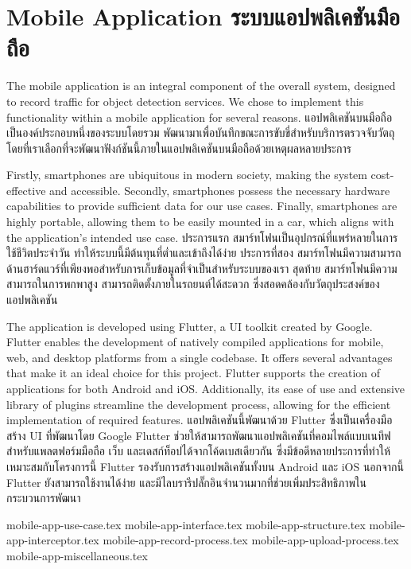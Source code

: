 \clearpage

\section{\ifenglish Mobile Application \else ระบบแอปพลิเคชันมือถือ \fi}
\ifenglish
The mobile application is an integral component of the overall system, designed to record traffic for object detection services. We chose to implement this functionality within a mobile application for several reasons.
\else
แอปพลิเคชันบนมือถือเป็นองค์ประกอบหนึ่งของระบบโดยรวม พัฒนามาเพื่อบันทึกขณะการขับขี่สำหรับบริการตรวจจับวัตถุ โดยที่เราเลือกที่จะพัฒนาฟังก์ชันนี้ภายในแอปพลิเคชันบนมือถือด้วยเหตุผลหลายประการ
\fi

\ifenglish
Firstly, smartphones are ubiquitous in modern society, making the system cost-effective and accessible. Secondly, smartphones possess the necessary hardware capabilities to provide sufficient data for our use cases. Finally, smartphones are highly portable, allowing them to be easily mounted in a car, which aligns with the application's intended use case.
\else
ประการแรก สมาร์ทโฟนเป็นอุปกรณ์ที่แพร่หลายในการใช้ชีวิตประจำวัน ทำให้ระบบนี้มีต้นทุนที่ต่ำและเข้าถึงได้ง่าย ประการที่สอง สมาร์ทโฟนมีความสามารถด้านฮาร์ดแวร์ที่เพียงพอสำหรับการเก็บข้อมูลที่จำเป็นสำหรับระบบของเรา สุดท้าย สมาร์ทโฟนมีความสามารถในการพกพาสูง สามารถติดตั้งภายในรถยนต์ได้สะดวก ซึ่งสอดคล้องกับวัตถุประสงค์ของแอปพลิเคชัน
\fi

\ifenglish
The application is developed using Flutter, a UI toolkit created by Google. \cite{flutter-doc} Flutter enables the development of natively compiled applications for mobile, web, and desktop platforms from a single codebase. It offers several advantages that make it an ideal choice for this project. Flutter supports the creation of applications for both Android and iOS. Additionally, its ease of use and extensive library of plugins streamline the development process, allowing for the efficient implementation of required features.
\else
แอปพลิเคชันนี้พัฒนาด้วย Flutter ซึ่งเป็นเครื่องมือสร้าง UI ที่พัฒนาโดย Google Flutter \cite{flutter-doc} ช่วยให้สามารถพัฒนาแอปพลิเคชันที่คอมไพล์แบบเนทีฟสำหรับแพลตฟอร์มมือถือ เว็บ และเดสก์ท็อปได้จากโค้ดเบสเดียวกัน ซึ่งมีข้อดีหลายประการที่ทำให้เหมาะสมกับโครงการนี้ Flutter รองรับการสร้างแอปพลิเคชันทั้งบน Android และ iOS นอกจากนี้ Flutter ยังสามารถใช้งานได้ง่าย และมีไลบรารีปลั๊กอินจำนวนมากที่ช่วยเพิ่มประสิทธิภาพในกระบวนการพัฒนา
\fi

\newcommand{\mobileDir}{chapters/approach/mobile-app}
{mobile-app-use-case.tex}
{mobile-app-interface.tex}
{mobile-app-structure.tex}
{mobile-app-interceptor.tex}
{mobile-app-record-process.tex}
{mobile-app-upload-process.tex}
{mobile-app-miscellaneous.tex}

